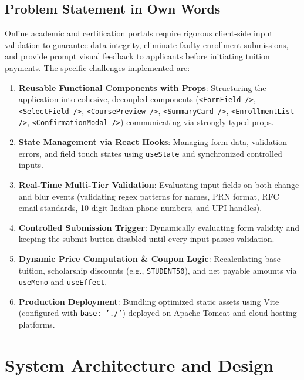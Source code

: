 \documentclass[11pt,a4paper]{article}
\begin{document}
\subsection{Problem Statement in Own Words}
Online academic and certification portals require rigorous client-side input validation to guarantee data integrity, eliminate faulty enrollment submissions, and provide prompt visual feedback to applicants before initiating tuition payments. The specific challenges implemented are:
\begin{enumerate}
    \item \textbf{Reusable Functional Components with Props}: Structuring the application into cohesive, decoupled components (\texttt{<FormField />}, \texttt{<SelectField />}, \texttt{<CoursePreview />}, \texttt{<SummaryCard />}, \texttt{<EnrollmentList />}, \texttt{<ConfirmationModal />}) communicating via strongly-typed props.
    \item \textbf{State Management via React Hooks}: Managing form data, validation errors, and field touch states using \texttt{useState} and synchronized controlled inputs.
    \item \textbf{Real-Time Multi-Tier Validation}: Evaluating input fields on both change and blur events (validating regex patterns for names, PRN format, RFC email standards, 10-digit Indian phone numbers, and UPI handles).
    \item \textbf{Controlled Submission Trigger}: Dynamically evaluating form validity and keeping the submit button disabled until every input passes validation.
    \item \textbf{Dynamic Price Computation \& Coupon Logic}: Recalculating base tuition, scholarship discounts (e.g., \texttt{STUDENT50}), and net payable amounts via \texttt{useMemo} and \texttt{useEffect}.
    \item \textbf{Production Deployment}: Bundling optimized static assets using Vite (configured with \texttt{base: './'}) deployed on Apache Tomcat and cloud hosting platforms.
\end{enumerate}

\section{System Architecture and Design}
\end{document}
